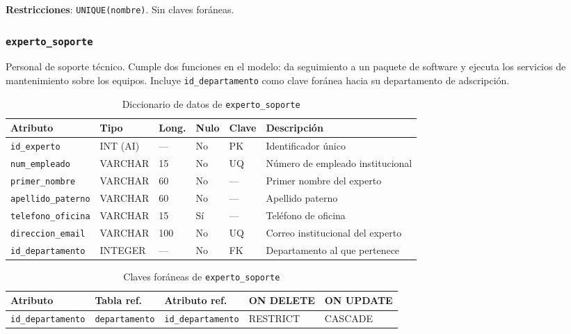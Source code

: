 \documentclass[10pt,a4paper]{article}
\begin{document}
\textbf{Restricciones}: \texttt{UNIQUE(nombre)}. Sin claves foráneas.

\subsubsection{\texttt{experto\_soporte}}

Personal de soporte técnico. Cumple dos funciones en el modelo: da seguimiento a un paquete de software y ejecuta los servicios de mantenimiento sobre los equipos. Incluye \texttt{id\_departamento} como clave foránea hacia su departamento de adscripción.

\begin{table}[H]
	\centering
	\footnotesize
	\begin{tabular}{p{2.9cm} | p{1.6cm} | p{0.8cm} | p{0.7cm} | p{1cm} | p{7.2cm}}\hline \hline
		\textbf{Atributo} & \textbf{Tipo} & \textbf{Long.} & \textbf{Nulo} & \textbf{Clave} & \textbf{Descripción} \\ \hline \hline
		\texttt{id\_experto} & INT (AI) & --- & No & PK & Identificador único \\ \hline
		\texttt{num\_empleado} & VARCHAR & 15 & No & UQ & Número de empleado institucional \\ \hline
		\texttt{primer\_nombre} & VARCHAR & 60 & No & --- & Primer nombre del experto \\ \hline
		\texttt{apellido\_paterno} & VARCHAR & 60 & No & --- & Apellido paterno \\ \hline
		\texttt{telefono\_oficina} & VARCHAR & 15 & Sí & --- & Teléfono de oficina \\ \hline
		\texttt{direccion\_email} & VARCHAR & 100 & No & UQ & Correo institucional del experto \\ \hline
		\texttt{id\_departamento} & INTEGER & --- & No & FK & Departamento al que pertenece \\ \hline \hline
	\end{tabular}
	\caption{Diccionario de datos de \texttt{experto\_soporte}}
	\label{tabla:dic-experto}
\end{table}

\begin{table}[H]
	\centering
	\footnotesize
	\begin{tabular}{p{3.6cm} | p{3.4cm} | p{3.4cm} | p{1.5cm} | p{1.5cm}}\hline \hline
		\textbf{Atributo} & \textbf{Tabla ref.} & \textbf{Atributo ref.} & \textbf{ON DELETE} & \textbf{ON UPDATE} \\ \hline \hline
		\texttt{id\_departamento} & \texttt{departamento} & \texttt{id\_departamento} & RESTRICT & CASCADE \\ \hline \hline
	\end{tabular}
	\caption{Claves foráneas de \texttt{experto\_soporte}}
	\label{tabla:fk-experto}
\end{table}
\end{document}
